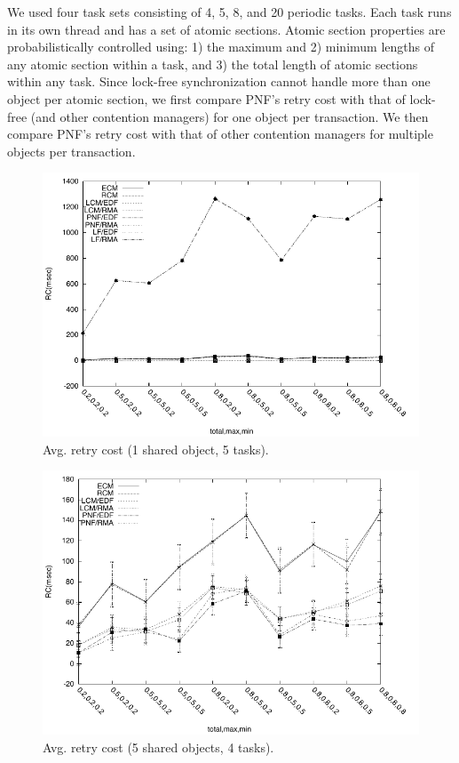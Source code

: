 \documentclass[twocolumn]{article}
\begin{document}
We used four task sets consisting of 4, 5, 8, and 20 periodic tasks. Each task runs in its own thread and has a set of atomic sections. Atomic section properties are probabilistically controlled using: 1) the maximum and 2) minimum lengths of any atomic section within a task, and 3) the total length of atomic sections within any task. Since lock-free synchronization cannot handle more than one object per atomic section, we first compare PNF's retry cost with that of lock-free (and other contention managers) for one object per transaction. We then compare PNF's retry cost with that of other contention managers for multiple objects per transaction.

\begin{figure}[h]
\centering
\includegraphics[scale=0.7]{figures/Abr_dur_5t_1obj_1wr}
\caption{Avg. retry cost (1 shared object, 5 tasks).}
\label{fig:pnf_results_uniobject}
\end{figure}

\begin{figure}[h]
\centering
\includegraphics[scale=0.7]{figures/Abr_dur_4t_5obj_1wr}
\caption{Avg. retry cost (5 shared objects, 4 tasks).}
\label{fig-RC-pnf-4t}
\end{figure}
\end{document}
